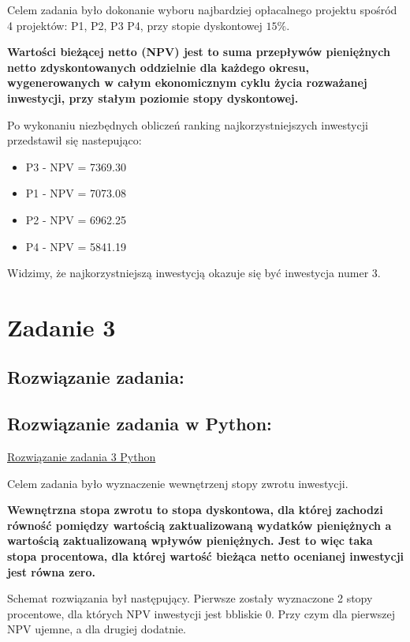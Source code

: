 \documentclass{article}
\begin{document}
	Celem zadania było dokonanie wyboru najbardziej opłacalnego projektu spośród 4 projektów: P1, P2, P3 P4, przy stopie dyskontowej $15\%$. \newline
	
	\textbf{Wartości bieżącej netto (NPV) jest to suma przepływów pieniężnych netto zdyskontowanych
	oddzielnie dla każdego okresu, wygenerowanych w całym ekonomicznym cyklu życia rozważanej
	inwestycji, przy stałym poziomie stopy dyskontowej.}

	Po wykonaniu niezbędnych obliczeń ranking najkorzystniejszych inwestycji przedstawił się nastepująco:
	\begin{itemize}
		\item 
		P3 - NPV = 7369.30 
		\item 
		P1 - NPV = 7073.08
		\item
		P2 - NPV = 6962.25
		\item 
		P4 - NPV = 5841.19
		
	\end{itemize}
	
	Widzimy, że najkorzystniejszą inwestycją okazuje się być inwestycja numer 3.
	\newpage
	\section*{Zadanie 3}
	
	
	\subsection*{Rozwiązanie zadania:}
	
	
	\subsection*{Rozwiązanie zadania w Python:}
	\href{https://github.com/slaw999999999/OEI/blob/main/Zadanie1.ipynb}{Rozwiązanie zadania 3 Python}
	
	Celem zadania było wyznaczenie wewnętrzenj stopy zwrotu inwestycji.\newline
	
	\textbf{Wewnętrzna stopa zwrotu to stopa dyskontowa, dla której
		zachodzi równość pomiędzy wartością zaktualizowaną wydatków pieniężnych a wartością zaktualizowaną
		wpływów pieniężnych. Jest to więc taka stopa procentowa, dla której wartość bieżąca netto ocenianej
		inwestycji jest równa zero.}
	
	Schemat rozwiązania był następujący. Pierwsze zostały wyznaczone 2 stopy procentowe, dla których NPV inwestycji jest bbliskie 0. Przy czym dla pierwszej NPV ujemne, a dla drugiej dodatnie.\newline
	
\end{document}

